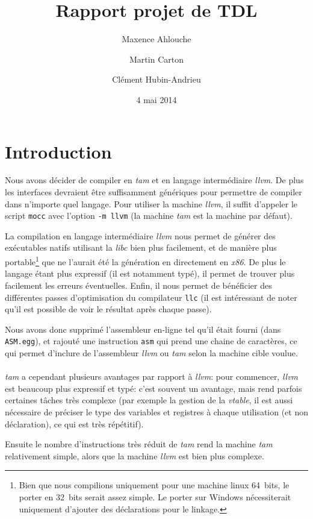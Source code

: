 \documentclass{scrartcl}
\title{Rapport projet de TDL}
\author{Maxence Ahlouche \and Martin Carton \and Clément Hubin-Andrieu}
\date{4 mai 2014}
\newcommand{\llvm}{\textit{llvm}}
\newcommand{\tam} {\textit{tam}}
\begin{document}
  \maketitle
  \tableofcontents
  \newpage

\section{Introduction}
  Nous avons décider de compiler en \tam{} et en langage intermédiaire \llvm{}.
  De plus les interfaces devraient être suffisamment génériques pour permettre
  de compiler dans n'importe quel langage. Pour utiliser la machine \llvm{}, il
  suffit d'appeler le script \texttt{mocc} avec l'option \verb+-m llvm+ (la
  machine \tam{} est la machine par défaut).

  La compilation en langage intermédiaire \llvm{} nous permet de générer des
  exécutables natifs utilisant la \textit{libc} bien plus facilement, et de
  manière plus portable\footnote{Bien que nous compilions uniquement pour une
  machine linux 64~bits, le porter en 32~bits serait assez simple. Le porter
  sur Windows nécessiterait uniquement d'ajouter des déclarations pour le
  linkage.} que ne l'aurait été la génération en directement en
  \textit{x86}. De plus le langage étant plus expressif (il est notamment typé),
  il permet de trouver plus facilement les erreurs éventuelles. Enfin, il nous
  permet de bénéficier des différentes passes d'optimisation du compilateur
  \verb+llc+ (il est intéressant de noter qu'il est possible de voir le
  résultat après chaque passe).

  Nous avons donc supprimé l'assembleur en-ligne tel qu'il était fourni (dans
  \verb+ASM.egg+), et rajouté une instruction \verb+asm+ qui prend une chaine
  de caractères, ce qui permet d'inclure de l'assembleur \llvm{} ou \tam{}
  selon la machine cible voulue.

  \paragraph{}
  \tam{} a cependant plusieurs avantages par rapport à \llvm{}: pour commencer,
  \llvm{} est beaucoup plus expressif et typé: c'est souvent un avantage, mais
  rend parfois certaines tâches très complexe (par exemple la gestion de la
  \textit{vtable}, il est aussi nécessaire de préciser le type des variables et
  registres à chaque utilisation (et non déclaration), ce qui est très
  répétitif).

  Ensuite le nombre d'instructions très réduit de \tam{} rend la machine \tam{}
  relativement simple, alors que la machine \llvm{} est bien plus complexe.
\end{document}
